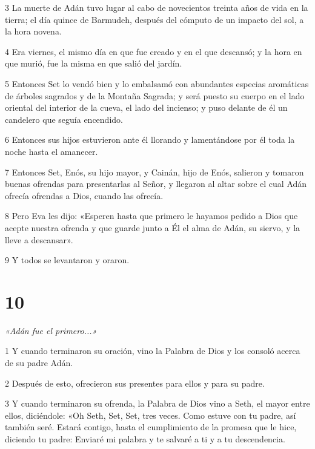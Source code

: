 \par 3 La muerte de Adán tuvo lugar al cabo de novecientos treinta años de vida en la tierra; el día quince de Barmudeh, después del cómputo de un impacto del sol, a la hora novena.

\par 4 Era viernes, el mismo día en que fue creado y en el que descansó; y la hora en que murió, fue la misma en que salió del jardín.

\par 5 Entonces Set lo vendó bien y lo embalsamó con abundantes especias aromáticas de árboles sagrados y de la Montaña Sagrada; y será puesto su cuerpo en el lado oriental del interior de la cueva, el lado del incienso; y puso delante de él un candelero que seguía encendido.

\par 6 Entonces sus hijos estuvieron ante él llorando y lamentándose por él toda la noche hasta el amanecer.

\par 7 Entonces Set, Enós, su hijo mayor, y Cainán, hijo de Enós, salieron y tomaron buenas ofrendas para presentarlas al Señor, y llegaron al altar sobre el cual Adán ofrecía ofrendas a Dios, cuando las ofrecía.

\par 8 Pero Eva les dijo: «Esperen hasta que primero le hayamos pedido a Dios que acepte nuestra ofrenda y que guarde junto a Él el alma de Adán, su siervo, y la lleve a descansar».

\par 9 Y todos se levantaron y oraron.

\chapter{10}

\par \textit{«Adán fue el primero...»}

\par 1 Y cuando terminaron su oración, vino la Palabra de Dios y los consoló acerca de su padre Adán.

\par 2 Después de esto, ofrecieron sus presentes para ellos y para su padre.

\par 3 Y cuando terminaron su ofrenda, la Palabra de Dios vino a Seth, el mayor entre ellos, diciéndole: «Oh Seth, Set, Set, tres veces. Como estuve con tu padre, así también seré. Estará contigo, hasta el cumplimiento de la promesa que le hice, diciendo tu padre: Enviaré mi palabra y te salvaré a ti y a tu descendencia.

